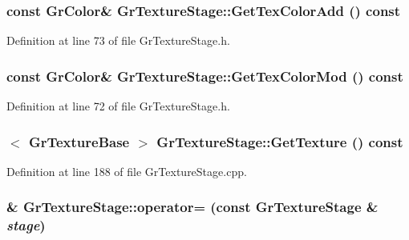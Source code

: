 \begin{CompactItemize}
{\subsubsection[{GetTexColorAdd}]{\setlength{\rightskip}{0pt plus 5cm}const {\bf GrColor}\& GrTextureStage::GetTexColorAdd () const}}
\label{class_gr_texture_stage_be60ecb1b07e9e3765c5c5119eaa114f}




Definition at line 73 of file GrTextureStage.h.\hypertarget{class_gr_texture_stage_593eb3d965cd99ca91b4e09127a892e6}{
\subsubsection[{GetTexColorMod}]{\setlength{\rightskip}{0pt plus 5cm}const {\bf GrColor}\& GrTextureStage::GetTexColorMod () const}}
\label{class_gr_texture_stage_593eb3d965cd99ca91b4e09127a892e6}




Definition at line 72 of file GrTextureStage.h.\hypertarget{class_gr_texture_stage_89083b0faeed97261a4ae0feb512fc8b}{
\subsubsection[{GetTexture}]{$<$ {\bf GrTextureBase} $>$ GrTextureStage::GetTexture () const}}
\label{class_gr_texture_stage_89083b0faeed97261a4ae0feb512fc8b}




Definition at line 188 of file GrTextureStage.cpp.\hypertarget{class_gr_texture_stage_078a1d7c0fa18ab8a73bcad6ee5037ae}{
\subsubsection[{operator=}]{ \& GrTextureStage::operator= (const {\bf GrTextureStage} \& {\em stage})}}
\label{class_gr_texture_stage_078a1d7c0fa18ab8a73bcad6ee5037ae}





\end{CompactItemize}
